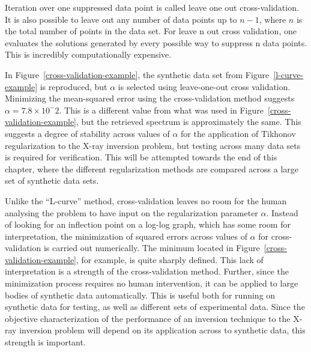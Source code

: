 Iteration over one suppressed data point is called leave one out cross-validation. It is also possible to leave out any number of data points up to $n-1$, where $n$ is the total number of points in the data set. For leave n out cross validation, one evaluates the solutions generated by every possible way to suppress n data points. This is incredibly computationally expensive. 

In Figure~\ref{cross-validation-example}, the synthetic data set from Figure~\ref{l-curve-example} is reproduced, but $\alpha$ is selected using leave-one-out cross validation. Minimizing the mean-squared error using the cross-validation method suggests $\alpha=7.8\times10^-2.$ This is a different value from what was used in Figure~\ref{cross-validation-example}, but the retrieved spectrum is approximately the same. This suggests a degree of stability across values of $\alpha$ for the application of Tikhonov regularization to the X-ray inversion problem, but testing across many data sets is required for verification. This will be attempted towards the end of this chapter, where the different regularization methods are compared across a large set of synthetic data sets. 

Unlike the ``L-curve'' method, cross-validation leaves no room for the human analysing the problem to have input on the regularization parameter $\alpha$. Instead of looking for an inflection point on a log-log graph, which has some room for interpretation, the minimization of squared errors across values of $\alpha$ for cross-validation is carried out numerically. The minimum located in Figure~\ref{cross-validation-example}, for example, is quite sharply defined. This lack of interpretation is a strength of the cross-validation method. Further, since the minimization process requires no human intervention, it can be  applied to large bodies of synthetic data automatically. This is useful both for running on synthetic data for testing, as well as different sets of experimental data. Since the objective characterization of the performance of an inversion technique to the X-ray inversion problem will depend on its application across to synthetic data, this strength is important. 

